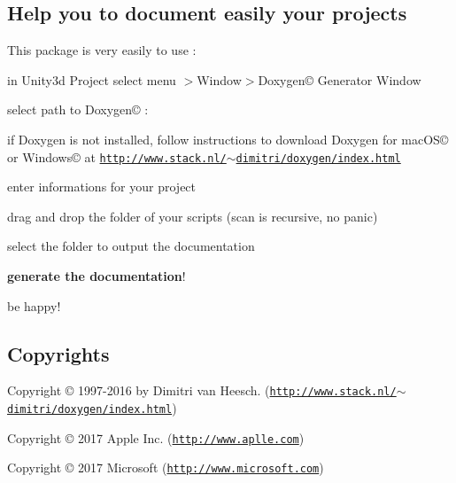 \subsection*{Help you to document easily your projects}

This package is very easily to use \+:


\begin{DoxyItemize}
\item in Unity3d Project select menu $>$Window$>$Doxygen© Generator Window
\item select path to Doxygen© \+:
\begin{DoxyItemize}
\item if Doxygen is not installed, follow instructions to download Doxygen for mac\+O\+S© or Windows© at \href{http://www.stack.nl/~dimitri/doxygen/index.html}{\tt http\+://www.\+stack.\+nl/$\sim$dimitri/doxygen/index.\+html}
\end{DoxyItemize}
\item enter informations for your project
\item drag and drop the folder of your scripts (scan is recursive, no panic)
\item select the folder to output the documentation
\item {\bfseries generate the documentation}!
\item be happy!
\end{DoxyItemize}

\subsection*{Copyrights}


\begin{DoxyItemize}
\item Copyright © 1997-\/2016 by Dimitri van Heesch. (\href{http://www.stack.nl/~dimitri/doxygen/index.html}{\tt http\+://www.\+stack.\+nl/$\sim$dimitri/doxygen/index.\+html})
\item Copyright © 2017 Apple Inc. (\href{http://www.aplle.com}{\tt http\+://www.\+aplle.\+com})
\item Copyright © 2017 Microsoft (\href{http://www.microsoft.com}{\tt http\+://www.\+microsoft.\+com}) 
\end{DoxyItemize}
